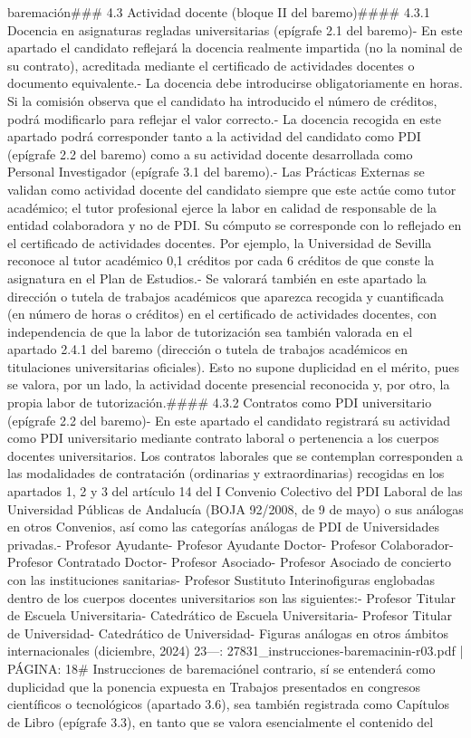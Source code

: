 \documentclass{article}
\begin{document}
\begin{itemize}
{{{{{{baremación\n\n### 4.3 Actividad docente (bloque II del baremo)\n\n#### 4.3.1 Docencia en asignaturas regladas universitarias (epígrafe 2.1 del baremo)\n\n- En este apartado el candidato reflejará la docencia realmente impartida (no la nominal de su contrato), acreditada mediante el certificado de actividades docentes o documento equivalente.\n- La docencia debe introducirse obligatoriamente en horas. Si la comisión observa que el candidato ha introducido el número de créditos, podrá modificarlo para reflejar el valor correcto.\n- La docencia recogida en este apartado podrá corresponder tanto a la actividad del candidato como PDI (epígrafe 2.2 del baremo) como a su actividad docente desarrollada como Personal Investigador (epígrafe 3.1 del baremo).\n- Las Prácticas Externas se validan como actividad docente del candidato siempre que este actúe como tutor académico; el tutor profesional ejerce la labor en calidad de responsable de la entidad colaboradora y no de PDI. Su cómputo se corresponde con lo reflejado en el certificado de actividades docentes. Por ejemplo, la Universidad de Sevilla reconoce al tutor académico 0,1 créditos por cada 6 créditos de que conste la asignatura en el Plan de Estudios.\n- Se valorará también en este apartado la dirección o tutela de trabajos académicos que aparezca recogida y cuantificada (en número de horas o créditos) en el certificado de actividades docentes, con independencia de que la labor de tutorización sea también valorada en el apartado 2.4.1 del baremo (dirección o tutela de trabajos académicos en titulaciones universitarias oficiales). Esto no supone duplicidad en el mérito, pues se valora, por un lado, la actividad docente presencial reconocida y, por otro, la propia labor de tutorización.\n\n#### 4.3.2 Contratos como PDI universitario (epígrafe 2.2 del baremo)\n\n- En este apartado el candidato registrará su actividad como PDI universitario mediante contrato laboral o pertenencia a los cuerpos docentes universitarios. Los contratos laborales que se contemplan corresponden a las modalidades de contratación (ordinarias y extraordinarias) recogidas en los apartados 1, 2 y 3 del artículo 14 del I Convenio Colectivo del PDI Laboral de las Universidad Públicas de Andalucía (BOJA 92/2008, de 9 de mayo) o sus análogas en otros Convenios, así como las categorías análogas de PDI de Universidades privadas.\n- Profesor Ayudante\n- Profesor Ayudante Doctor\n- Profesor Colaborador\n- Profesor Contratado Doctor\n- Profesor Asociado\n- Profesor Asociado de concierto con las instituciones sanitarias\n- Profesor Sustituto Interino\n\nLas figuras englobadas dentro de los cuerpos docentes universitarios son las siguientes:\n- Profesor Titular de Escuela Universitaria\n- Catedrático de Escuela Universitaria\n- Profesor Titular de Universidad\n- Catedrático de Universidad\n- Figuras análogas en otros ámbitos internacionales\n{} (diciembre, 2024) 23\n\n---\n\nFUENTE: 27831_instrucciones-baremacinin-r03.pdf | PÁGINA: 18\n# Instrucciones de baremación\n\nPor el contrario, sí se entenderá como duplicidad que la ponencia expuesta en Trabajos presentados en congresos científicos o tecnológicos (apartado 3.6), sea también registrada como Capítulos de Libro (epígrafe 3.3), en tanto que se valora esencialmente el contenido del }}}}}}
\end{itemize}
\end{document}
